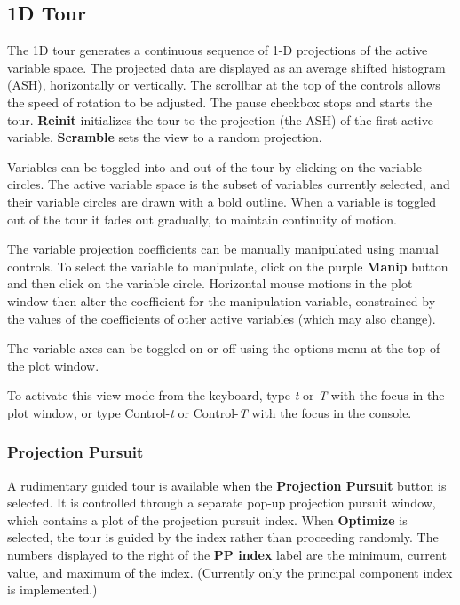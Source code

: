 \documentclass[11pt]{article}
\begin{document}
\subsection{1D Tour}
\label{slbl:1DTour}

The 1D tour generates a continuous sequence of 1-D projections of the
active variable space. The projected data are displayed as an average
shifted histogram (ASH), horizontally or vertically. The scrollbar at the
top of the controls allows the speed of rotation to be adjusted. The
pause checkbox stops and starts the tour. {\bf Reinit} initializes the tour
to the projection (the ASH) of the first active variable.  {\bf Scramble} sets
the view to a random projection.

Variables can be toggled into and out of the tour by clicking on the
variable circles. The active variable space is the subset of variables
currently selected, and their variable circles are drawn with
a bold outline. When a variable is toggled out of the tour it fades out
gradually, to maintain continuity of motion.

The variable projection coefficients can be manually manipulated
using manual controls. To select the variable to manipulate, click on
the purple {\bf Manip} button and then click on the variable circle.
Horizontal mouse motions in the plot window then alter the coefficient for
the manipulation variable, constrained by the values of the coefficients
of other active variables (which may also change).

The variable axes can be toggled on or off using the options menu at
the top of the plot window.

To activate this view mode from the keyboard, type {\em t} or {\em T}
with the focus in the plot window, or type Control-{\em t} or
Control-{\em T} with the focus in the console.

\subsubsection{Projection Pursuit}

A rudimentary guided tour is available when the {\bf Projection Pursuit}
button is selected. It is controlled through a separate pop-up projection
pursuit window, which contains a plot of the projection pursuit index.
When {\bf Optimize} is selected, the tour is guided by the index rather
than proceeding randomly.  The numbers displayed to the right of the {\bf
PP index} label are the minimum, current value, and maximum of the index.
(Currently only the principal component index is implemented.)
\end{document}
